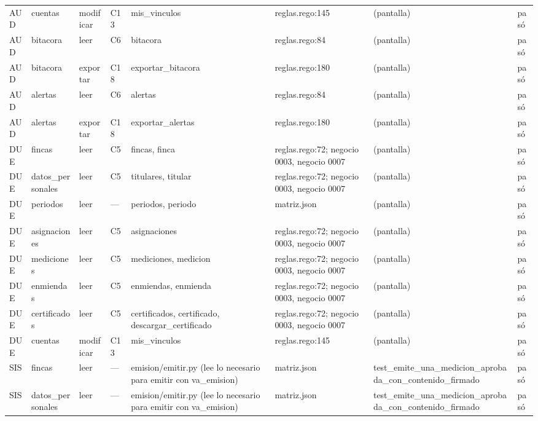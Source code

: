 \begin{center}
\begin{longtable}{@{}p{0.6cm} p{1.7cm} p{1.2cm} p{0.9cm} p{3.4cm} p{2.6cm} p{3.4cm} p{0.8cm}@{}}
AUD & cuentas & modificar & C13 & mis\_vinculos & reglas.rego:145 & (pantalla) & pasó \\
AUD & bitacora & leer & C6 & bitacora & reglas.rego:84 & (pantalla) & pasó \\
AUD & bitacora & exportar & C18 & exportar\_bitacora & reglas.rego:180 & (pantalla) & pasó \\
AUD & alertas & leer & C6 & alertas & reglas.rego:84 & (pantalla) & pasó \\
AUD & alertas & exportar & C18 & exportar\_alertas & reglas.rego:180 & (pantalla) & pasó \\
DUE & fincas & leer & C5 & fincas, \allowbreak{}finca & reglas.rego:72; negocio 0003, negocio 0007 & (pantalla) & pasó \\
DUE & datos\_\allowbreak{}personales & leer & C5 & titulares, \allowbreak{}titular & reglas.rego:72; negocio 0003, negocio 0007 & (pantalla) & pasó \\
DUE & periodos & leer & — & periodos, \allowbreak{}periodo & matriz.json & (pantalla) & pasó \\
DUE & asignaciones & leer & C5 & asignaciones & reglas.rego:72; negocio 0003, negocio 0007 & (pantalla) & pasó \\
DUE & mediciones & leer & C5 & mediciones, \allowbreak{}medicion & reglas.rego:72; negocio 0003, negocio 0007 & (pantalla) & pasó \\
DUE & enmiendas & leer & C5 & enmiendas, \allowbreak{}enmienda & reglas.rego:72; negocio 0003, negocio 0007 & (pantalla) & pasó \\
DUE & certificados & leer & C5 & certificados, \allowbreak{}certificado, \allowbreak{}descargar\_certificado & reglas.rego:72; negocio 0003, negocio 0007 & (pantalla) & pasó \\
DUE & cuentas & modificar & C13 & mis\_vinculos & reglas.rego:145 & (pantalla) & pasó \\
SIS & fincas & leer & — & emision/emitir.py (lee lo necesario para emitir con va\_emision) & matriz.json & test\_\allowbreak{}emite\_\allowbreak{}una\_\allowbreak{}medicion\_\allowbreak{}aprobada\_\allowbreak{}con\_\allowbreak{}contenido\_\allowbreak{}firmado & pasó \\
SIS & datos\_\allowbreak{}personales & leer & — & emision/emitir.py (lee lo necesario para emitir con va\_emision) & matriz.json & test\_\allowbreak{}emite\_\allowbreak{}una\_\allowbreak{}medicion\_\allowbreak{}aprobada\_\allowbreak{}con\_\allowbreak{}contenido\_\allowbreak{}firmado & pasó \\

\end{longtable}
\end{center}
